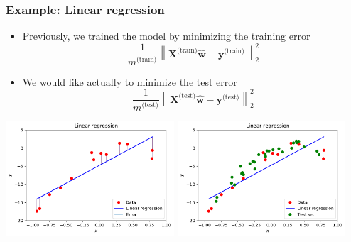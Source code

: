 \documentclass[notes]{beamer}          %
\newcommand{\vect}[1]{\bm{#1}}
\newcommand{\norm}[1]{\left\lVert#1\right\rVert}
\providecommand{\norm}[1]{\lVert#1\rVert}
\newif\iffull
\begin{document}
\iffull
\begin{frame}
\frametitle{Generalization error}
    \begin{itemize}
        \item {\bf Generalization error}, also called {\bf test error} is defined as the expected error on new, previously unseen data.
        \item Unlike in simple optimization, in machine learning our main goal is to minimize the {\bf generalization error}.
        \item Usually the generalization error is estimated by measuring the performance on a {\bf test data set} which must be independent from the training set.
    \end{itemize}
\end{frame}
\fi

\begin{frame}
\frametitle{Example: Linear regression}
 \begin{itemize}
        \item Previously, we trained the model by minimizing the training error
        $$
        \frac{1}{m^{\mbox{(train)}}}\norm{\vect{X}^{\mbox{(train)}}\hat{\vect{w}} - \vect{y}^{\mbox{(train)}}}_2^2
        $$
        \item We would like actually to minimize the test error
         $$
        \frac{1}{m^{\mbox{(test)}}}\norm{\vect{X}^{\mbox{(test)}}\hat{\vect{w}} - \vect{y}^{\mbox{(test)}}}_2^2
        $$
\end{itemize}
\begin{center}
        \includegraphics[width=0.47\textwidth]{../figures/week_1/linear_regression_error.pdf}
        \includegraphics[width=0.47\textwidth]{../figures/week_1/linear_regression_test_set.pdf}
\end{center}
\end{frame}
\end{document}
